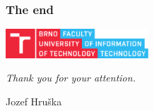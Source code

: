 \begin{frame}
	\frametitle{The end}
	
	\includegraphics[width=0.4\textwidth]{img/fitlogo1.pdf}
	
	\bigskip
	\bigskip

	\begin{huge}
		\emph{Thank you for your attention.}
	\end{huge}

	\medskip

	Jozef Hruška
\end{frame}